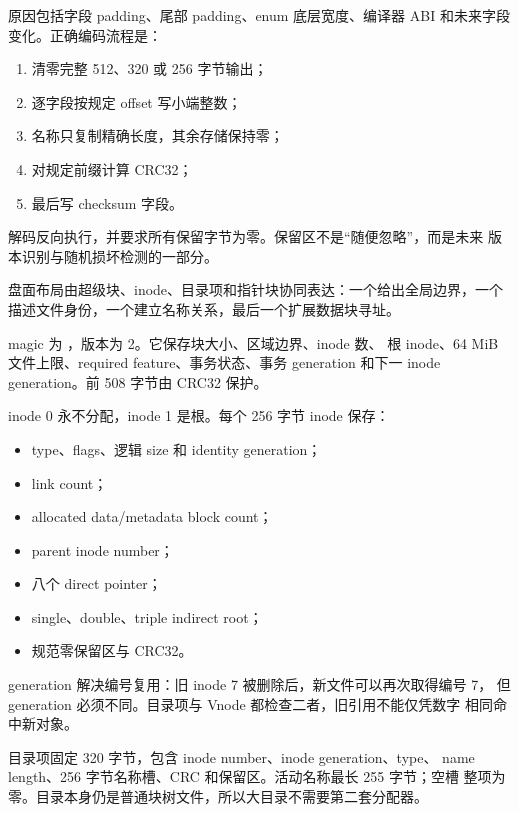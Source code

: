 原因包括字段 padding、尾部 padding、enum 底层宽度、编译器 ABI 和未来字段
变化。正确编码流程是：

\begin{enumerate}
  \item 清零完整 512、320 或 256 字节输出；
  \item 逐字段按规定 offset 写小端整数；
  \item 名称只复制精确长度，其余存储保持零；
  \item 对规定前缀计算 CRC32；
  \item 最后写 checksum 字段。
\end{enumerate}

解码反向执行，并要求所有保留字节为零。保留区不是“随便忽略”，而是未来
版本识别与随机损坏检测的一部分。

盘面布局由超级块、inode、目录项和指针块协同表达：一个给出全局边界，一个
描述文件身份，一个建立名称关系，最后一个扩展数据块寻址。


magic 为 ，版本为 2。它保存块大小、区域边界、inode 数、
根 inode、64 MiB 文件上限、required feature、事务状态、事务 generation
和下一 inode generation。前 508 字节由 CRC32 保护。


inode 0 永不分配，inode 1 是根。每个 256 字节 inode 保存：

\begin{itemize}
  \item type、flags、逻辑 size 和 identity generation；
  \item link count；
  \item allocated data/metadata block count；
  \item parent inode number；
  \item 八个 direct pointer；
  \item single、double、triple indirect root；
  \item 规范零保留区与 CRC32。
\end{itemize}

generation 解决编号复用：旧 inode 7 被删除后，新文件可以再次取得编号 7，
但 generation 必须不同。目录项与 Vnode 都检查二者，旧引用不能仅凭数字
相同命中新对象。


目录项固定 320 字节，包含 inode number、inode generation、type、
name length、256 字节名称槽、CRC 和保留区。活动名称最长 255 字节；空槽
整项为零。目录本身仍是普通块树文件，所以大目录不需要第二套分配器。

